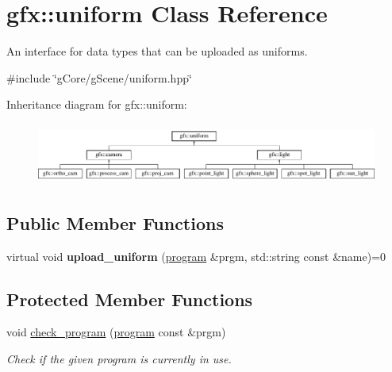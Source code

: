 \hypertarget{classgfx_1_1uniform}{\section{gfx\-:\-:uniform Class Reference}
\label{classgfx_1_1uniform}
}


An interface for data types that can be uploaded as uniforms.  




{\ttfamily \#include \char`\"{}g\-Core/g\-Scene/uniform.\-hpp\char`\"{}}

Inheritance diagram for gfx\-:\-:uniform\-:\begin{figure}[H]
\begin{center}
\leavevmode
\includegraphics[height=2.033898cm]{classgfx_1_1uniform}
\end{center}
\end{figure}
\subsection*{Public Member Functions}
\begin{DoxyCompactItemize}
\item 
\hypertarget{classgfx_1_1uniform_a65fc8c10d9f8929c1104855eb80f219b}{virtual void {\bfseries upload\-\_\-uniform} (\hyperlink{classgfx_1_1program}{program} \&prgm, std\-::string const \&name)=0}\label{classgfx_1_1uniform_a65fc8c10d9f8929c1104855eb80f219b}

\end{DoxyCompactItemize}
\subsection*{Protected Member Functions}
\begin{DoxyCompactItemize}
\item 
void \hyperlink{classgfx_1_1uniform_a4e6baa0f0523b6d0a9b40f2590f4fc2d}{check\-\_\-program} (\hyperlink{classgfx_1_1program}{program} const \&prgm)
\begin{DoxyCompactList}\small\item\em Check if the given program is currently in use. \end{DoxyCompactList}\end{DoxyCompactItemize}


